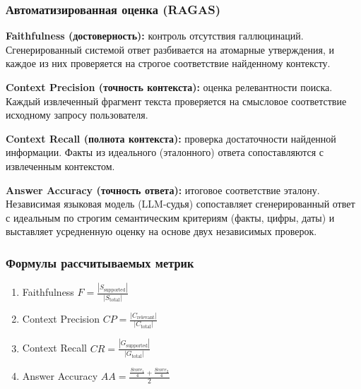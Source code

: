 \documentclass[aspectratio=169, xcolor={table}, usepdftitle=false]{beamer} %
\begin{document}
\begin{frame}
\frametitle{Автоматизированная оценка (RAGAS)}
\small
\textbf{Faithfulness (достоверность):} контроль отсутствия галлюцинаций. Сгенерированный системой ответ разбивается на атомарные утверждения, и каждое из них проверяется на строгое соответствие найденному контексту. 
\vspace{0.3cm}

\textbf{Context Precision (точность контекста):} оценка релевантности поиска. Каждый извлеченный фрагмент текста проверяется на смысловое соответствие исходному запросу пользователя.
\vspace{0.3cm}

\textbf{Context Recall (полнота контекста):} проверка достаточности найденной информации. Факты из идеального (эталонного) ответа сопоставляются с извлеченным контекстом.
\vspace{0.3cm}

\textbf{Answer Accuracy (точность ответа):} итоговое соответствие эталону. Независимая языковая модель (LLM-судья) сопоставляет сгенерированный ответ с идеальным по строгим семантическим критериям (факты, цифры, даты) и выставляет усредненную оценку на основе двух независимых проверок.
\end{frame}

\begin{frame}
\frametitle{Формулы рассчитываемых метрик}
\Large
\begin{enumerate}
    \setlength{\itemsep}{10pt}
    \item Faithfulness \hspace{2cm} $F = \frac{|S_{\text{supported}}|}{|S_{\text{total}}|}$
    
    \item Context Precision \hspace{1cm} $CP = \frac{|C_{\text{relevant}}|}{|C_{\text{total}}|}$
    
    \item Context Recall \hspace{1.7cm} $CR = \frac{|G_{\text{supported}}|}{|G_{\text{total}}|}$
    
    \item Answer Accuracy \hspace{1.3cm} $AA = \frac{\frac{Score_1}{4} + \frac{Score_2}{4}}{2}$
\end{enumerate}
\end{frame}
\end{document}
